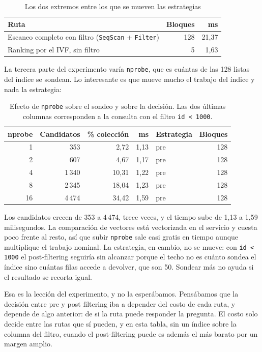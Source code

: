 \documentclass[a4paper,12pt]{article}
\begin{document}
\begin{table}[H]
\centering
\caption{Los dos extremos entre los que se mueven las estrategias}
\begin{tabular}{@{}lrr@{}}
\toprule
\textbf{Ruta} & \textbf{Bloques} & \textbf{ms} \\
\midrule
Escaneo completo con filtro (\texttt{SeqScan} + \texttt{Filter}) & 128 & 21{,}37 \\
Ranking por el IVF, sin filtro & 5 & 1{,}63 \\
\bottomrule
\end{tabular}
\end{table}

La tercera parte del experimento varía \texttt{nprobe}, que es cuántas de las
128 listas del índice se sondean. Lo interesante es que mueve mucho el trabajo
del índice y nada la estrategia:

\begin{table}[H]
\centering
\caption{Efecto de \texttt{nprobe} sobre el sondeo y sobre la decisión. Las dos
últimas columnas corresponden a la consulta con el filtro
\texttt{id \textless{} 1000}.}
\begin{tabular}{@{}rrrrlr@{}}
\toprule
\textbf{nprobe} & \textbf{Candidatos} & \textbf{\% colección} &
\textbf{ms} & \textbf{Estrategia} & \textbf{Bloques} \\
\midrule
1 & 353 & 2{,}72 & 1{,}13 & pre & 128 \\
2 & 607 & 4{,}67 & 1{,}17 & pre & 128 \\
4 & 1\,340 & 10{,}31 & 1{,}22 & pre & 128 \\
8 & 2\,345 & 18{,}04 & 1{,}23 & pre & 128 \\
16 & 4\,474 & 34{,}42 & 1{,}59 & pre & 128 \\
\bottomrule
\end{tabular}
\end{table}

Los candidatos crecen de 353 a 4\,474, trece veces, y el tiempo sube de 1{,}13 a
1{,}59 milisegundos. La comparación de vectores está vectorizada en el servicio y
cuesta poco frente al resto, así que subir \texttt{nprobe} sale casi gratis en
tiempo aunque multiplique el trabajo nominal. La estrategia, en cambio, no se
mueve: con \texttt{id \textless{} 1000} el post-filtering seguiría sin alcanzar porque el
techo no es cuánto sondea el índice sino cuántas filas accede a devolver, que son
50. Sondear más no ayuda si el resultado se recorta igual.

Esa es la lección del experimento, y no la esperábamos. Pensábamos que la
decisión entre pre y post filtering iba a depender del costo de cada ruta, y
depende de algo anterior: de si la ruta puede responder la pregunta. El costo
solo decide entre las rutas que sí pueden, y en esta tabla, sin un índice sobre
la columna del filtro, cuando el post-filtering puede es además el más barato por
un margen amplio.
\end{document}
